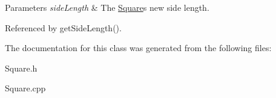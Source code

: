 \begin{DoxyParams}{Parameters}
{\em side\+Length} & The \hyperlink{classtsgl_1_1_square}{Square}\textquotesingle{}s new side length. \\
\hline
\end{DoxyParams}


Referenced by get\+Side\+Length().



The documentation for this class was generated from the following files\+:\begin{DoxyCompactItemize}
\item 
Square.\+h\item 
Square.\+cpp\end{DoxyCompactItemize}
